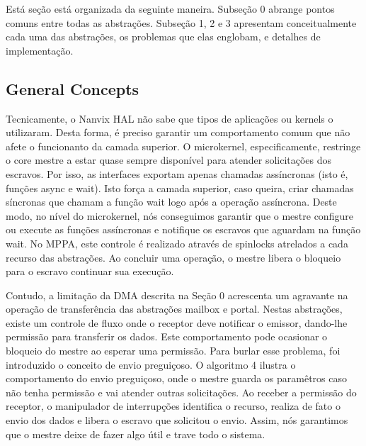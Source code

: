 		Está seção está organizada da seguinte maneira.
		Subseção 0 abrange pontos comuns entre todas as abstrações.
		Subseção 1, 2 e 3 apresentam conceitualmente cada uma das abstrações, os problemas que elas englobam, e detalhes de implementação.

		\subsection{General Concepts}
		\label{sec.general-concepts}

			Tecnicamente, o Nanvix HAL não sabe que tipos de aplicações ou kernels o utilizaram.
			Desta forma, é preciso garantir um comportamento comum que não afete o funcionanto da camada superior.
			O microkernel, especificamente, restringe o core mestre a estar quase sempre disponível para atender solicitações dos escravos.
			Por isso, as interfaces exportam apenas chamadas assíncronas (isto é, funções async e wait).
			Isto força a camada superior, caso queira, criar chamadas síncronas que chamam a função wait logo após a operação assíncrona.
			Deste modo, no nível do microkernel, nós conseguimos garantir que o mestre configure ou execute as funções assíncronas e notifique os escravos que aguardam na função wait.
			No MPPA, este controle é realizado através de spinlocks atrelados a cada recurso das abstrações.
			Ao concluir uma operação, o mestre libera o bloqueio para o escravo continuar sua execução.

			Contudo, a limitação da DMA descrita na Seção 0 acrescenta um agravante na operação de transferência das abstrações mailbox e portal.
			Nestas abstrações, existe um controle de fluxo onde o receptor deve notificar o emissor, dando-lhe permissão para transferir os dados.
			Este comportamento pode ocasionar o bloqueio do mestre ao esperar uma permissão.
			Para burlar esse problema, foi introduzido o conceito de envio preguiçoso.
			O algoritmo 4 ilustra o comportamento do envio preguiçoso, onde o mestre guarda os paramêtros caso não tenha permissão e vai atender outras solicitações.
			Ao receber a permissão do receptor, o manipulador de interrupções identifica o recurso, realiza de fato o envio dos dados e libera o escravo que solicitou o envio.
			Assim, nós garantimos que o mestre deixe de fazer algo útil e trave todo o sistema.

